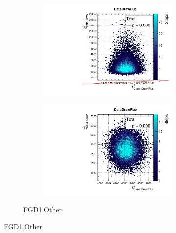 \begin{figure}[h]
\begin{subfigure}[t]{\textwidth}
\begin{subfigure}[t]{0.24\textwidth}
		\end{subfigure}
		\begin{subfigure}[t]{0.24\textwidth}
			\includegraphics[width=\textwidth, trim={0mm 0mm 0mm 8mm}, clip,page=29]{figures/mach3/2018/data/2018a_FixedCov_RedCov_Mpi_Data_merge_PriorPred_procs}
		\end{subfigure}
		\begin{subfigure}[t]{0.24\textwidth}
			\includegraphics[width=\textwidth, trim={0mm 0mm 0mm 8mm}, clip,page=29]{figures/mach3/2018/data/2018a_FixedCov_RedCov_Mpi_Data_merge_PostPredStore_FullLLH_procs}
		\end{subfigure}
		\caption{FGD1 Other}
	\end{subfigure}
	

\end{figure}
